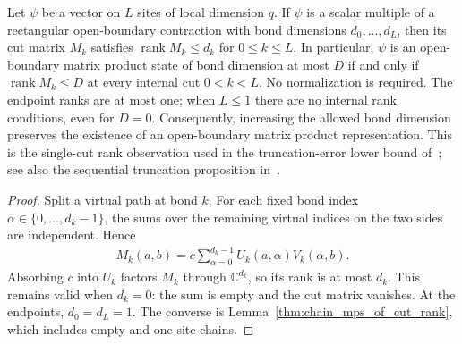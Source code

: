 \begin{theorem}
    \label{thm:chain_cut_rank_of_mps}
    \leanok
    Let $\psi$ be a vector on $L$ sites of local dimension $q$.
    If $\psi$ is a scalar multiple of a rectangular open-boundary
    contraction with bond dimensions $d_0,\ldots,d_L$, then its cut
    matrix $M_k$ satisfies $\operatorname{rank}M_k\le d_k$ for
    $0\le k\le L$. In particular, $\psi$ is an open-boundary matrix
    product state of bond dimension at most $D$ if and only if
    $\operatorname{rank}M_k\le D$ at every internal cut $0<k<L$.
    No normalization is required. The endpoint ranks are at most one;
    when $L\le1$ there are no internal rank conditions, even for $D=0$.
    Consequently, increasing the allowed bond dimension preserves the
    existence of an open-boundary matrix product representation.
    This is the single-cut rank observation used in the truncation-error
    lower bound of~\cite{Schuch2008EntropyScaling}; see also the sequential
    truncation proposition in~\cite[Part IIa]{TNLean2026OneDimensional}.
\end{theorem}
\begin{proof}
    \leanok
    Split a virtual path at bond $k$. For each fixed
    bond index $\alpha\in\{0,\ldots,d_k-1\}$, the sums over the remaining
    virtual indices on the two sides are independent. Hence
    \begin{align}
        M_k(a,b)=c\sum_{\alpha=0}^{d_k-1}U_k(a,\alpha)V_k(\alpha,b).
    \end{align}
    Absorbing $c$ into $U_k$ factors $M_k$ through $\mathbb C^{d_k}$,
    so its rank is at most $d_k$. This remains valid when $d_k=0$:
    the sum is empty and the cut matrix vanishes. At the endpoints,
    $d_0=d_L=1$. The converse is
    Lemma~\ref{thm:chain_mps_of_cut_rank}, which includes empty and
    one-site chains.
\end{proof}

